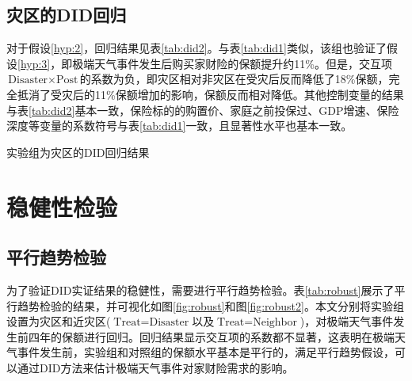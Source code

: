 \subsection{灾区的DID回归}
对于假设\ref{hyp:2}，回归结果见表\ref{tab:did2}。与表\ref{tab:did1}类似，该组也验证了假设\ref{hyp:3}，即极端天气事件发生后购买家财险的保额提升约11\%。但是，交互项$\text{Disaster}\times \text{Post}$的系数为负，即灾区相对非灾区在受灾后反而降低了18\%保额，完全抵消了受灾后的11\%保额增加的影响，保额反而相对降低。其他控制变量的结果与表\ref{tab:did2}基本一致，保险标的的购置价、家庭之前投保过、GDP增速、保险深度等变量的系数符号与表\ref{tab:did1}一致，且显著性水平也基本一致。

\begin{table}[H]
    \centering
    \caption{实验组为灾区的DID回归结果}\label{tab:did2}
    
\end{table}

\section{稳健性检验}
\subsection{平行趋势检验}

为了验证DID实证结果的稳健性，需要进行平行趋势检验。表\ref{tab:robust}展示了平行趋势检验的结果，并可视化如图\ref{fig:robust}和图\ref{fig:robust2}。本文分别将实验组设置为灾区和近灾区($\text{Treat}=\text{Disaster}$以及$\text{Treat}=\text{Neighbor}$)，对极端天气事件发生前四年的保额进行回归。回归结果显示交互项的系数都不显著，这表明在极端天气事件发生前，实验组和对照组的保额水平基本是平行的，满足平行趋势假设，可以通过DID方法来估计极端天气事件对家财险需求的影响。

